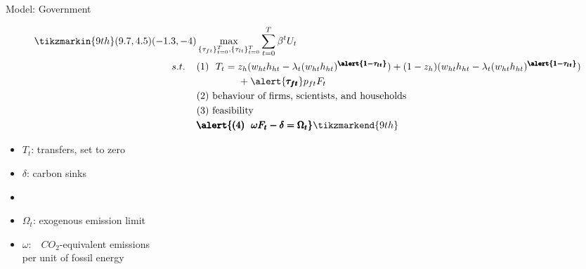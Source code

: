 \documentclass[11pt,aspectratio=169]{beamer}
\begin{document}
\addtocounter{framenumber}{-1}
\begin{frame}{Model: Government}
\begin{minipage}[t!]{1\textwidth}
	\begin{align*}
	\tikzmarkin{9th}(9.7,4.5)(-1.3,-4)
&\max_{\{\tau_{ft}\}_{t=0}^{T}, \{\tau_{lt}\}_{t=0}^{T}} \sum_{t=0}^{T}\beta^t U_{t}\\
s.t. \hspace{4mm}
&(1)\ \ T_t = z_h(w_{ht}h_{ht}-\lambda_t(w_{ht}h_{ht})^{\pmb{\alert{1-\tau_{lt}}}})+(1-z_h)(w_{ht}h_{ht}-\lambda_t(w_{ht}h_{ht})^{\pmb{\alert{1-\tau_{lt}}}})\\ & \hspace{15mm }+\alert{\pmb{\tau_{ft}}}p_{ft}F_{t}\\
& (2)\ \text{behaviour of firms, scientists, and households}\\
& (3)\ \text{feasibility} \\
&\pmb{\alert{
(4)\ \  \omega F_t-\delta =\Omega_t }
}	\tikzmarkend{9th}
	\end{align*}
\end{minipage}

\small
\vspace{-3mm}
\begin{minipage}[t!]{0.35\textwidth}
\vspace{7mm}
\begin{itemize}
	\item[] $T_t$: transfers, set to zero  \vspace{0mm}
	\item[] $\delta$: carbon sinks\vspace{-2mm}
	\item[] 
\end{itemize}
\end{minipage}
\begin{minipage}[t!]{0.6\textwidth}
\vspace{8mm}
\begin{itemize}
	\item[] $\Omega_{t}$: exogenous emission limit
	\vspace{0mm}	
		\item[] $\omega$:\ \ $CO_2$-equivalent emissions \\ \hspace{4mm} per unit of fossil energy
\end{itemize}
\end{minipage}

\end{frame}
\end{document}
